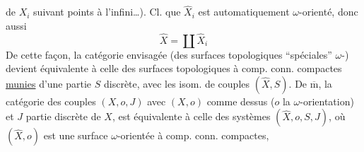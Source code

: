  de $X_i$ suivant  points à l'infini\ldots).
Cl. que $\widehat X_i$ est automatiquement $\omega$-orienté,
donc aussi
\[\widehat X=\coprod\widehat X_i\]
De cette façon, la catégorie envisagée
(des surfaces topologiques ``spéciales''
$\omega$-) devient équivalente à
celle des surfaces topologiques 
à comp. conn. compactes \uline{munies}
d'une partie  $S$ discrète,
avec les isom. de couples $(\widehat X,S)$.
De $\overline{\mathrm m}$, la catégorie des couples
 $(X,o,J)$ avec $(X,o)$ comme
dessus ($o$ la $\omega$-orientation) et
$J$ partie discrète de $X$, est équivalente à celle des systèmes
$(\widehat X,o,S,J)$, où $(\widehat X,o)$ est une surface
$\omega$-orientée à comp. conn. compactes,
